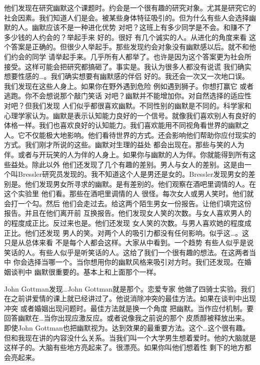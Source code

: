 他们发现在研究幽默这个课题时。约会是一个很有趣的研究对象。尤其是研究它的社会因素。我们知道人们是会。被某些身体特征吸引的。但为什么有些人会选择幽默的人。幽默应该不是一种进化优势 对吧？这班上有多少同学是不会。和赚不了多少钱的人约会的？举起手来 好的。很好 有几个诚实的人。从进化的角度来看 这个答案是正确的。但很少人举起手。那些发现约会对象没有幽默感以后。就不和他们约会的同学 请举起手来。几乎所有人都举了。也许是因为这个答案更为社会所接受。这样可能会把研究都搞砸了。事实是。我认为很多人都没有说谎 我们确实想要性感的…。我们确实想要有幽默感的伴侣 好的。我还会一次又一次地口误。我们发现在这些人身上。如果你在野外遇到危险 例如遇到狮子。你想打赢它 或者逃跑。你不会想说那个敲门笑话 对吧？幽默并不能增加你。对自然选择的适应性 对吧？但我们发现 人们似乎都很喜欢幽默。不同性别的幽默是不同的。科学家和心理学家认为。幽默是表示认知能力良好的一个信号。就像我们喜欢别人有良好的体格一样。我们也喜欢良好的认知能力。我们喜欢能用不同视角看世界的幽默之人。它不仅能极大地影响。他们看待世界的方式。还会影响他们帮助你应付现实的方式。我们刚才所说的这些。幽默对生理的益处 都会出现在。那些与笑的人为伴。或者与开玩笑的人为伴的人身上。如果你与幽默的人为伴。你就能得到所有这些益处。除此以外 他们还发现了几个有趣的差别。男人与女人的差别。这是由一个叫Bressler研究员发现的。我不知道这个人是男还是女的。Bressler发现男女的差别是。他们发现男女所寻求的幽默。是有差别的。他们观察在酒吧里调情的人。在这个实验里 他们看。那些在酒吧里调情的人 很怪。每次女人或男人笑时。他们就会打一个勾。然后 他们会走过去。给这两个陌生男女一份报告。让他们填完这份报告。并且在他们离开前 互换报告。他们发现女人笑的次数。与女人喜欢男人的的程度成正比。反过来也是。他们还发现 女人笑的次数。与男人喜欢她的程度成正比。他们还发现 男人的笑。对两个人的吸引力都没有任何影响。似乎这…。这只是从总体来看 不是每个人都会这样。大家从中看到。一个趋势 有些人似乎是说笑话的人。有些人似乎是听笑话的人。这给了我们一个很有趣的想法。在这两者当中 你会选择当哪一个。当你想用你的幽默风格来吸引对方时。我们还发现。在婚姻谈判中 幽默很重要的。基本上和上面那个一样。 

John Gottman发现…John Gottman就是那个。恋爱专家 他做了四骑士实验。我们在之前讲爱情的课上就已经讲过了。他说消除冲突的最佳方法。如果在谈判中出现冲突 或者婚姻出现问题时。最佳方法就是换一个角度 把幽默。当作应付机制。要回答幽默在…当你出现应激反应。或者说像我之前说的那个 皮质醇被释放出来。即使John Gottman也把幽默视为。达到效果的最重要方法。这个…这个很有趣。但和我现在讲的内容没什么关系。当我们叫一个大学男生想着爱时。他的大脑就是这样子的。大脑有些地方亮起来了。很漂亮。如果你叫他们想着性 剩下的地方都会亮起来。 

